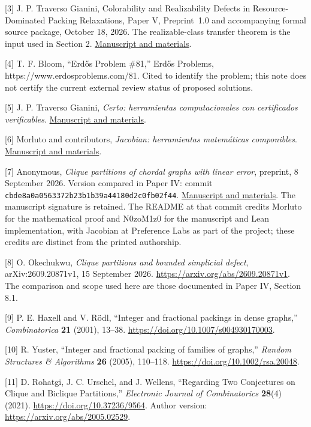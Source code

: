 \documentclass[english,11pt,a4paper]{article}
\begin{document}
{[}3{]} J. P. Traverso Gianini, Colorability and Realizability Defects
in Resource-Dominated Packing Relaxations, Paper V, \mbox{Preprint 1.0} and
accompanying formal source package, October 18, 2026. The
realizable-class transfer theorem is the input used in Section 2.
\href{https://github.com/jtraverso/erdos-81-chordal-clique-partitions/tree/main/preprints/PAPER_V}{Manuscript
and materials}.

{[}4{]} T. F. Bloom, ``Erdős Problem \#81,'' Erdős Problems,
https://www.erdosproblems.com/81. Cited to identify the problem; this
note does not certify the current external review status of proposed
solutions.

{[}5{]} J. P. Traverso Gianini, \emph{Certo: herramientas
computacionales con certificados verificables}.
\href{https://github.com/jtraverso/certo-math}{Manuscript and
materials}.

{[}6{]} Morluto and contributors, \emph{Jacobian: herramientas
matemáticas componibles}.
\href{https://github.com/morluto/jacobian}{Manuscript and materials}.

{[}7{]} Anonymous, \emph{Clique partitions of chordal graphs with linear
error}, preprint, 8 September 2026. Version compared in Paper IV: commit
\nolinkurl{cbde8a0a0563372b23b1b39a44180d2c0fb02f44}.
\href{https://github.com/N0zoM1z0/erdos-81/blob/cbde8a0a0563372b23b1b39a44180d2c0fb02f44/manuscript/main.pdf}{Manuscript
and materials}. The manuscript signature is retained. The README at that
commit credits Morluto for the mathematical proof and N0zoM1z0 for the
manuscript and Lean implementation, with Jacobian at Preference Labs as
part of the project; these credits are distinct from the printed
authorship.

{[}8{]} O. Okechukwu, \emph{Clique partitions and bounded simplicial
defect}, arXiv:2609.20871v1, 15 September 2026.
\url{https://arxiv.org/abs/2609.20871v1}. The comparison and scope used
here are those documented in Paper IV, Section 8.1.

{[}9{]} P. E. Haxell and V. Rödl, ``Integer and fractional packings in
dense graphs,'' \emph{Combinatorica} \textbf{21} (2001), 13--38.
\url{https://doi.org/10.1007/s004930170003}.

{[}10{]} R. Yuster, ``Integer and fractional packing of families of
graphs,'' \emph{Random Structures \& Algorithms} \textbf{26} (2005),
110--118. \url{https://doi.org/10.1002/rsa.20048}.

{[}11{]} D. Rohatgi, J. C. Urschel, and J. Wellens, ``Regarding Two
Conjectures on Clique and Biclique Partitions,'' \emph{Electronic
Journal of Combinatorics} \textbf{28}(4) (2021).
\url{https://doi.org/10.37236/9564}. Author version:
\url{https://arxiv.org/abs/2005.02529}.
\end{document}
